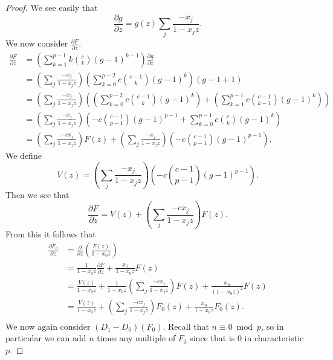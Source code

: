 \documentclass{amsart}
\numberwithin{equation}{section}
\theoremstyle{definition}
\begin{document}
\begin{proof}
We see easily that 
\[
\frac{\partial g}{\partial z} = g(z) \sum_j \frac{-x_j}{1-x_jz}.
\]
We now consider $\frac{\partial F}{\partial z}$.
\begin{align*}
\frac{\partial F}{\partial z}%
&=\left(\sum_{k=1}^{p-1}k\binom{c}{k}(g-1)^{k-1}\right)\frac{\partial g}{\partial z}\\
&=\left(\sum_j \frac{-x_j}{1-x_jz}\right)\left(\sum_{k=0}^{p-2}c\binom{c-1}{k}(g-1)^{k}\right)(g-1+1)\\
&=\left(\sum_j \frac{-x_j}{1-x_jz}\right)\left(\left(\sum_{k=0}^{p-2}c\binom{c-1}{k}(g-1)^{k}\right)+\left(\sum_{k=1}^{p-1}c\binom{c-1}{k-1}(g-1)^{k}\right)\right)\\
&=\left(\sum_j \frac{-x_j}{1-x_jz}\right)\left(-c\binom{c-1}{p-1}(g-1)^{p-1}+\sum_{k=0}^{p-1}c\binom{c}{k}(g-1)^{k}\right)\\
&=\left(\sum_j \frac{-cx_j}{1-x_jz}\right)F(z)+\left(\sum_j \frac{-x_j}{1-x_jz}\right)\left(-c\binom{c-1}{p-1}(g-1)^{p-1}\right).
\end{align*}
We define 
\[
V(z)=\left(\sum_j \frac{-x_j}{1-x_jz}\right)\left(-c\binom{c-1}{p-1}(g-1)^{p-1}\right).
\]
Then we see that 
\[
\frac{\partial F}{\partial z}=V(z)+\left(\sum_j \frac{-cx_j}{1-x_jz}\right)F(z).
\]
From this it follows that
\begin{align*}
\frac{\partial F_0}{\partial z} &= \frac{\partial}{\partial z}\left(\frac{F(z)}{1-x_0z}\right)\\
&=\frac{1}{1-x_0z} \frac{\partial F}{\partial z}+\frac{x_0}{1-x_0z} F(z)\\
&=\frac{V(z)}{1-x_0z}+\frac{1}{1-x_0z}\left(\sum_j \frac{-cx_j}{1-x_jz}\right)F(z)+\frac{x_0}{(1-x_0z)^2} F(z)\\
&=\frac{V(z)}{1-x_0z}+\left(\sum_j \frac{-cx_j}{1-x_jz}\right)F_0(z)+\frac{x_0}{1-x_0z} F_0(z).\\
\end{align*}
We now again consider $(D_1-D_0)(F_0)$. Recall that $n \equiv 0 \bmod p$, so in particular we can add $n$ times any multiple of $F_0$ since that is $0$ in characteristic $p$. 

\end{proof}
\end{document}

